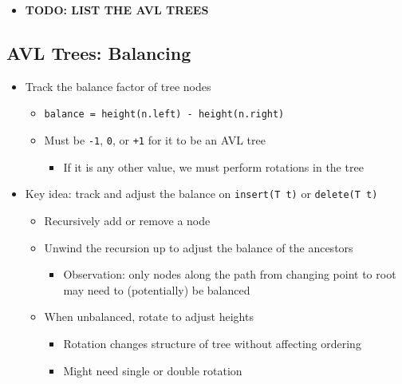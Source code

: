 \documentclass[
  10pt,
  english,
  letterpaper,
,tablecaptionabove
]{scrartcl}
\newcommand{\passthrough}[1]{#1}
\providecommand{\tightlist}{%
  \setlength{\itemsep}{0pt}\setlength{\parskip}{0pt}}
\begin{document}
\begin{itemize}
\tightlist
\item
  \textbf{TODO: LIST THE AVL TREES}
\end{itemize}

\hypertarget{avl-trees-balancing}{%
\subsection{AVL Trees: Balancing}\label{avl-trees-balancing}}

\begin{itemize}
\tightlist
\item
  Track the balance factor of tree nodes

  \begin{itemize}
  \tightlist
  \item
    \passthrough{\lstinline!balance = height(n.left) - height(n.right)!}
  \item
    Must be \passthrough{\lstinline!-1!}, \passthrough{\lstinline!0!},
    or \passthrough{\lstinline!+1!} for it to be an AVL tree

    \begin{itemize}
    \tightlist
    \item
      If it is any other value, we must perform rotations in the tree
    \end{itemize}
  \end{itemize}
\item
  Key idea: track and adjust the balance on
  \passthrough{\lstinline!insert(T t)!} or
  \passthrough{\lstinline!delete(T t)!}

  \begin{itemize}
  \tightlist
  \item
    Recursively add or remove a node
  \item
    Unwind the recursion up to adjust the balance of the ancestors

    \begin{itemize}
    \tightlist
    \item
      Observation: only nodes along the path from changing point to root
      may need to (potentially) be balanced
    \end{itemize}
  \item
    When unbalanced, rotate to adjust heights

    \begin{itemize}
    \tightlist
    \item
      Rotation changes structure of tree without affecting ordering
    \item
      Might need single or double rotation
    \end{itemize}
  \end{itemize}
\end{itemize}
\end{document}
